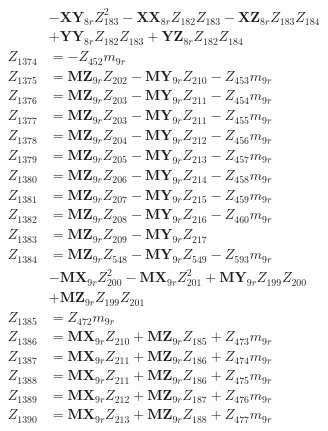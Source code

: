 \begin{multicols}{2}
\begin{align}
&- \mathbf{XY}_{8r}Z_{183}^2 - \mathbf{XX}_{8r}Z_{182}Z_{183} - \mathbf{XZ}_{8r}Z_{183}Z_{184}  \nonumber \\
&+ \mathbf{YY}_{8r}Z_{182}Z_{183} + \mathbf{YZ}_{8r}Z_{182}Z_{184} \nonumber \\
Z_{1374} &= -Z_{452}m_{9r} \nonumber \\
Z_{1375} &= \mathbf{MZ}_{9r}Z_{202} - \mathbf{MY}_{9r}Z_{210} - Z_{453}m_{9r} \nonumber \\
Z_{1376} &= \mathbf{MZ}_{9r}Z_{203} - \mathbf{MY}_{9r}Z_{211} - Z_{454}m_{9r} \nonumber \\
Z_{1377} &= \mathbf{MZ}_{9r}Z_{203} - \mathbf{MY}_{9r}Z_{211} - Z_{455}m_{9r} \nonumber \\
Z_{1378} &= \mathbf{MZ}_{9r}Z_{204} - \mathbf{MY}_{9r}Z_{212} - Z_{456}m_{9r} \nonumber \\
Z_{1379} &= \mathbf{MZ}_{9r}Z_{205} - \mathbf{MY}_{9r}Z_{213} - Z_{457}m_{9r} \nonumber \\
Z_{1380} &= \mathbf{MZ}_{9r}Z_{206} - \mathbf{MY}_{9r}Z_{214} - Z_{458}m_{9r} \nonumber \\
Z_{1381} &= \mathbf{MZ}_{9r}Z_{207} - \mathbf{MY}_{9r}Z_{215} - Z_{459}m_{9r} \nonumber \\
Z_{1382} &= \mathbf{MZ}_{9r}Z_{208} - \mathbf{MY}_{9r}Z_{216} - Z_{460}m_{9r} \nonumber \\
Z_{1383} &= \mathbf{MZ}_{9r}Z_{209} - \mathbf{MY}_{9r}Z_{217} \nonumber \\
Z_{1384} &= \mathbf{MZ}_{9r}Z_{548} - \mathbf{MY}_{9r}Z_{549} - Z_{593}m_{9r}  \nonumber \\
&- \mathbf{MX}_{9r}Z_{200}^2 - \mathbf{MX}_{9r}Z_{201}^2 + \mathbf{MY}_{9r}Z_{199}Z_{200}  \nonumber \\
&+ \mathbf{MZ}_{9r}Z_{199}Z_{201} \nonumber \\
Z_{1385} &= Z_{472}m_{9r} \nonumber \\
Z_{1386} &= \mathbf{MX}_{9r}Z_{210} + \mathbf{MZ}_{9r}Z_{185} + Z_{473}m_{9r} \nonumber \\
Z_{1387} &= \mathbf{MX}_{9r}Z_{211} + \mathbf{MZ}_{9r}Z_{186} + Z_{474}m_{9r} \nonumber \\
Z_{1388} &= \mathbf{MX}_{9r}Z_{211} + \mathbf{MZ}_{9r}Z_{186} + Z_{475}m_{9r} \nonumber \\
Z_{1389} &= \mathbf{MX}_{9r}Z_{212} + \mathbf{MZ}_{9r}Z_{187} + Z_{476}m_{9r} \nonumber \\
Z_{1390} &= \mathbf{MX}_{9r}Z_{213} + \mathbf{MZ}_{9r}Z_{188} + Z_{477}m_{9r} \nonumber \\

\end{align}
\end{multicols}
